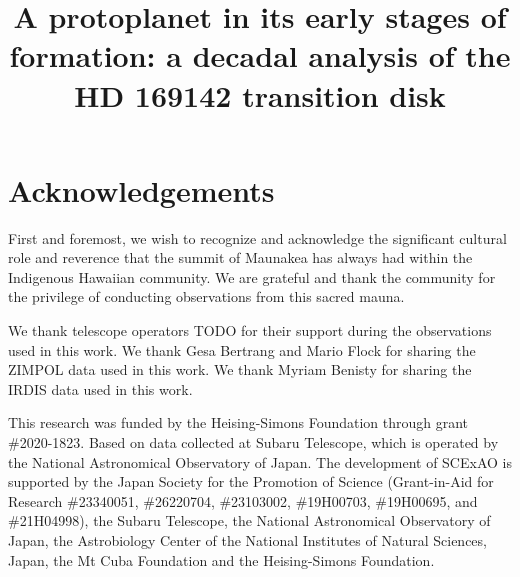 \documentclass[twocolumn]{aastex631}
\begin{document}
\title{A protoplanet in its early stages of formation: a decadal analysis of the HD 169142 transition disk}



\begin{abstract}
\end{abstract}







\section*{Acknowledgements}
First and foremost, we wish to recognize and acknowledge the significant cultural role and reverence that the summit of Maunakea has always had within the Indigenous Hawaiian community. We are grateful and thank the community for the privilege of conducting observations from this sacred mauna.

We thank telescope operators TODO for their support during the observations used in this work. We thank Gesa Bertrang and Mario Flock for sharing the ZIMPOL data used in this work. We thank Myriam Benisty for sharing the IRDIS data used in this work.

This research was funded by the Heising-Simons Foundation through grant \#2020-1823. Based on data collected at Subaru Telescope, which is operated by the National Astronomical Observatory of Japan. The development of SCExAO is supported by the Japan Society for the Promotion of Science (Grant-in-Aid for Research \#23340051, \#26220704, \#23103002, \#19H00703, \#19H00695, and \#21H04998), the Subaru Telescope, the National Astronomical Observatory of Japan, the Astrobiology Center of the National Institutes of Natural Sciences, Japan, the Mt Cuba Foundation and the Heising-Simons Foundation.


\end{document}
